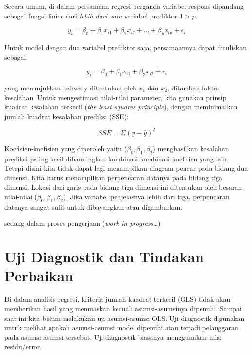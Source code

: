 \documentclass[
]{book}
\begin{document}
Secara umum, di dalam persamaan regresi berganda variabel respons dipandang sebagai fungsi linier dari \emph{lebih dari satu} variabel prediktor \(1>p\).

\begin{equation} 
y_i=\beta_0 + \beta_1x_{i1} + \beta_2x_{i2} + ... + \beta_px_{ip} + \epsilon_i
\label{eq:persamaan-ganda}
\end{equation}

Untuk model dengan dua variabel prediktor saja, persamaannya dapat dituliskan sebagai:

\begin{equation} 
y_i=\beta_0 + \beta_1x_{i1} + \beta_2x_{i2} + \epsilon_i
\label{eq:persamaan-2var}
\end{equation}

yang menunjukkan bahwa y ditentukan oleh \(x_1\) dan \(x_2\), ditambah faktor kesalahan. Untuk mengestimasi nilai-nilai parameter, kita gunakan prinsip kuadrat kesalahan terkecil (\emph{the least squares principle}), dengan meminimalkan jumlah kuadrat kesalahan prediksi (SSE):

\begin{equation}
SSE = \Sigma(y - \hat y)^2
\label{eq:persamaan-sse}
\end{equation}

Koefisien-koefisien yang diperoleh yaitu (\(\beta_0, \beta_1, \beta_2\)) menghasilkan kesalahan prediksi paling kecil dibandingkan kombinasi-kombinasi koefisien yang lain.
Tetapi disini kita tidak dapat lagi menampilkan diagram pencar pada bidang dua dimensi. Kita harus menampilkan perpencaran datanya pada bidang tiga dimensi. Lokasi dari garis pada bidang tiga dimensi ini ditentukan oleh besaran nilai-nilai (\(\beta_0, \beta_1, \beta_2\)). Jika variabel penjelasnya lebih dari tiga, perpencaran datanya sangat sulit untuk dibayangkan atau digambarkan.

sedang dalam proses pengerjaan (\emph{work in progress\ldots{}})

\hypertarget{uji-diagnostik-dan-tindakan-perbaikan}{%
\chapter{Uji Diagnostik dan Tindakan Perbaikan}\label{uji-diagnostik-dan-tindakan-perbaikan}}

Di dalam analisis regresi, kriteria jumlah kuadrat terkecil (OLS) tidak akan memberikan hasil yang memuaskan kecuali asumsi-asumsinya dipenuhi. Sampai saat ini kita belum melakukan uji asumsi-asumsi OLS. Uji diagnostik digunakan untuk melihat apakah asumsi-asumsi model dipenuhi atau terjadi pelanggaran pada asumsi-asumsi tersebut. Uji diagnostik biasanya menggunakan nilai residu/error.
\end{document}
